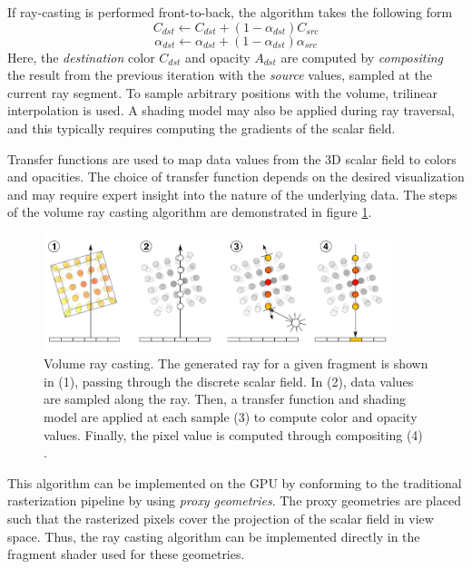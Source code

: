 \documentclass{article}
\begin{document}
If ray-casting is performed front-to-back, the algorithm takes the following form \cite{Kruger2006GPU}
$$ C_{dst} \leftarrow C_{dst} + (1-\alpha_{dst})C_{src} $$
$$ \alpha_{dst} \leftarrow \alpha_{dst} + (1-\alpha_{dst})\alpha_{src}$$
Here, the \textit{destination} color $C_{dst}$ and opacity $A_{dst}$ are computed by 
\textit{compositing} the result from the previous iteration with the \textit{source} values, sampled at the current ray segment. To sample arbitrary positions with the volume, trilinear interpolation is used. A shading model may also be applied during ray traversal,
and this typically requires computing the gradients of the scalar field.

Transfer functions are used to map data values from the 3D scalar field to colors and opacities. The choice of transfer function
depends on the desired visualization and may require expert insight into the nature of the underlying data.
The steps of the volume ray casting algorithm are demonstrated in figure \ref{fig:volumeRayCasting}.


\newpage
\begin{figure}[tbh]
    \centering
    \includegraphics[width=0.9\textwidth]{images/Volume_ray_casting.png}
    \caption{Volume ray casting. The generated ray for a given fragment is shown in (1), passing through the discrete scalar field. In (2), data values are sampled along the ray. Then, a transfer function and shading model are applied at each sample (3) to compute color and opacity values. Finally, the pixel value
    is computed through compositing (4) \cite{Hofmann2011}.}
    \label{fig:volumeRayCasting}
\end{figure}

This algorithm can be implemented on the GPU by conforming to the traditional rasterization pipeline by using \textit{proxy geometries}.
The proxy geometries are placed such that the rasterized pixels cover the projection of the scalar field in view space. Thus,
the ray casting algorithm can be implemented directly in the fragment shader used for these geometries. 




\end{document}
